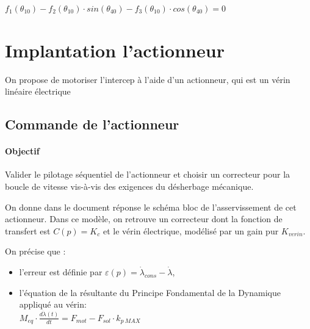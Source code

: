 

\begin{center}
$f_1(\theta_{10})-f_2(\theta_{10})\cdot	sin(\theta_{40})-f_3(\theta_{10}) \cdot cos(\theta_{40})=0$
\end{center}

\section{Implantation l'actionneur}

On propose de motoriser l'intercep à l'aide d'un actionneur, qui est un vérin linéaire électrique

\subsection{Commande de l'actionneur}

\paragraph{Objectif}

Valider le pilotage séquentiel de l'actionneur et choisir un correcteur pour la boucle de vitesse vis-à-vis des exigences du désherbage mécanique.

On donne dans le document réponse le schéma bloc de l'asservissement de cet actionneur. Dans ce modèle, on retrouve un correcteur dont la fonction de transfert est $C(p)=K_c$ et le vérin électrique, modélisé par un
gain pur $K_{verin}$.

On précise que :
\begin{itemize}
 \item l'erreur est définie par $\varepsilon(p)=\dot{\lambda}_{cons}-\dot{\lambda}$,
 \item l'équation de la résultante du Principe Fondamental de la Dynamique appliqué au vérin:\\
  $M_{eq}\cdot \frac{d\dot{\lambda}(t)}{dt}=F_{mot}-F_{sol}\cdot k_{p\ MAX}$
\end{itemize}

